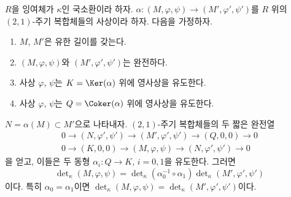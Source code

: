 \begin{lemma}
\label{lemma-tricky}
$R$을 잉여체가 $\kappa$인 국소환이라 하자.
$\alpha : (M, \varphi, \psi) \to (M', \varphi', \psi')$를 $R$ 위의
$(2, 1)$-주기 복합체들의 사상이라 하자. 다음을 가정하자.
\begin{enumerate}
\item $M$, $M'$은 유한 길이를 갖는다.
\item $(M, \varphi, \psi)$와 $(M', \varphi', \psi')$는 완전하다.
\item 사상 $\varphi$, $\psi$는 $K = \Ker(\alpha)$ 위에 영사상을
유도한다.
\item 사상 $\varphi$, $\psi$는 $Q = \Coker(\alpha)$ 위에 영사상을
유도한다.
\end{enumerate}
$N = \alpha(M) \subset M'$으로 나타내자. $(2, 1)$-주기 복합체들의
두 짧은 완전열
$$
\begin{matrix}
0 \to (N, \varphi', \psi') \to (M', \varphi', \psi') \to (Q, 0, 0) \to 0 \\
0 \to (K, 0, 0) \to (M, \varphi, \psi) \to (N, \varphi', \psi') \to 0
\end{matrix}
$$
을 얻고, 이들은 두 동형 $\alpha_i : Q \to K$, $i = 0, 1$을 유도한다.
그러면
$$
\det\nolimits_\kappa(M, \varphi, \psi)
=
\det\nolimits_\kappa(\alpha_0^{-1} \circ \alpha_1)
\det\nolimits_\kappa(M', \varphi', \psi')
$$
이다. 특히 $\alpha_0 = \alpha_1$이면
$\det\nolimits_\kappa(M, \varphi, \psi) =
\det\nolimits_\kappa(M', \varphi', \psi')$이다.
\end{lemma}

